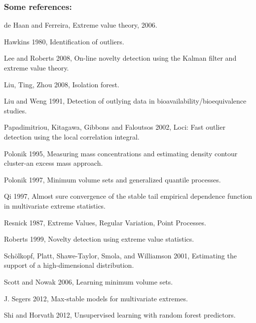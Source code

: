 \documentclass[9pt]{beamer}
\begin{document}
\begin{frame}
\frametitle{Some references:}
\begin{itemize}
\footnotesize{
\item de Haan and Ferreira, Extreme value theory, 2006.

\item Hawkins 1980, Identification of outliers.

\item Lee and Roberts 2008, On-line novelty detection using the Kalman filter and extreme value theory.

\item Liu, Ting, Zhou 2008, Isolation forest.

\item Liu and Weng 1991,  Detection of outlying data in bioavailability/bioequivalence studies. 

\item Papadimitriou, Kitagawa, Gibbons and Faloutsos 2002, Loci: Fast outlier detection using the local correlation integral.

\item Polonik 1995, Measuring mass concentrations and estimating density contour cluster-an excess mass approach.

\item Polonik 1997, Minimum volume sets and generalized quantile processes.

\item Qi 1997, Almost sure convergence of the stable tail empirical dependence function in multivariate extreme statistics.

\item Resnick 1987, Extreme Values, Regular Variation, Point Processes.

\item Roberts 1999, Novelty detection using extreme value statistics.

\item Sch{\"o}lkopf, Platt, Shawe-Taylor, Smola, and Williamson 2001, Estimating the support of a high-dimensional distribution.

\item Scott and Nowak 2006, Learning minimum volume sets.

\item J. Segers 2012, Max-stable models for multivariate extremes.

\item Shi and Horvath 2012, Unsupervised learning with random forest predictors.

}
\end{itemize}
\end{frame}
\end{document}
